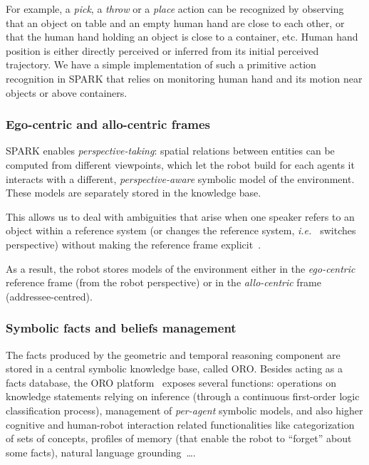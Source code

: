 \documentclass[preprint,5p]{elsarticle}
\newcommand{\ie}{{\textit{i.e.\ }}}
\begin{document}
For example, a \emph{pick}, a \emph{throw} or a \emph{place} action
can be recognized by observing that an object on table and an empty
human hand are close to each other, or that the human hand holding an
object is close to a container, etc. Human hand position is either
directly perceived or inferred from its initial perceived trajectory.
We have a simple implementation of such a primitive action recognition
in SPARK that relies on monitoring human hand and its motion near
objects or above containers.


\subsubsection{Ego-centric and allo-centric frames}

SPARK enables \emph{perspective-taking}: spatial relations between entities can
be computed from different viewpoints, which let the robot build for each
agents it interacts with a different, \emph{perspective-aware} symbolic model
of the environment. These models are separately stored in the knowledge base.

This allows us to deal with ambiguities that arise when one speaker refers to
an object within a reference system (or changes the reference system, \ie
switches perspective) without making the reference frame
explicit~\cite{Breazeal2006, Ros2010}.

As a result, the robot stores models of the environment either in the
\emph{ego-centric} reference frame (from the robot perspective) or in the
\emph{allo-centric} frame (addressee-centred).


\subsubsection{Symbolic facts and beliefs management}

The facts produced by the geometric and temporal reasoning component
are stored in a central symbolic knowledge base, called ORO. Besides
acting as a facts database, the ORO platform~\cite{Lemaignan2010}
exposes several functions: operations on knowledge statements relying
on inference (through a continuous first-order logic classification
process), management of \emph{per-agent} symbolic models, and also
higher cognitive and human-robot interaction related functionalities
like categorization of sets of concepts, profiles of memory (that
enable the robot to ``forget'' about some facts), natural language
grounding~\cite{Lemaignan2011}\ldots.
\end{document}
